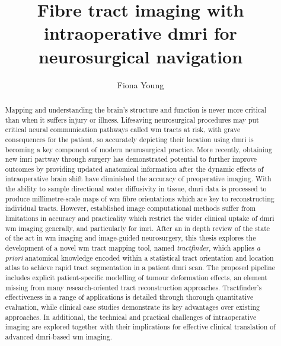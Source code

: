 
\title{ Fibre tract imaging with intraoperative \gls{dmri} for neurosurgical navigation }
\author{ Fiona Young }

\maketitle
\makedeclaration

\begin{abstract} %
Mapping and understanding the brain's structure and function is never more critical than when it suffers injury or illness.
Lifesaving neurosurgical procedures may put critical neural communication pathways called \gls{wm} tracts at risk, with grave consequences for the patient, so accurately depicting their location using \gls{dmri} is becoming a key component of modern neurosurgical practice.
More recently, obtaining new \gls{imri} partway through surgery has demonstrated potential to further improve outcomes by providing updated anatomical information after the dynamic effects of intraoperative brain shift have diminished the accuracy of preoperative imaging.
With the ability to sample directional water diffusivity in tissue, \gls{dmri} data is processed to produce millimetre-scale maps of \gls{wm} fibre orientations which are key to reconstructing individual tracts.
However, established image computational methods suffer from limitations in accuracy and practicality which restrict the wider clinical uptake of \gls{dmri} \gls{wm} imaging generally, and particularly for \gls{imri}.
After an in depth review of the state of the art in \gls{wm} imaging and image-guided neurosurgery, this thesis explores the development of a novel \gls{wm} tract mapping tool, named \textit{tractfinder}, which applies \textit{a priori} anatomical knowledge encoded within a statistical tract orientation and location atlas to achieve rapid tract segmentation in a patient \gls{dmri} scan.
The proposed pipeline includes explicit patient-specific modelling of tumour deformation effects, an element missing from many research-oriented tract reconstruction approaches.
Tractfinder's effectiveness in a range of applications is detailed through thorough quantitative evaluation, while clinical case studies demonstrate its key advantages over existing approaches.
In additional, the technical and practical challenges of intraoperative imaging are explored together with their implications for effective clinical translation of advanced \gls{dmri}-based \gls{wm} imaging.
\end{abstract}

